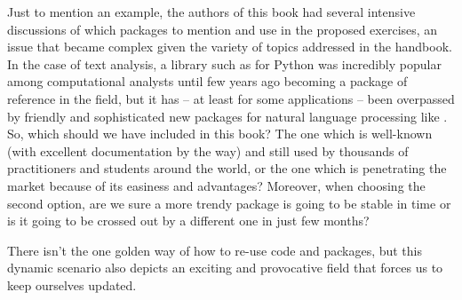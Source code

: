 Just to mention an example, the authors of this book had several intensive discussions of which packages to mention and use in the proposed exercises, an issue that became complex given the variety of topics addressed in the handbook. In the case of text analysis, a library such as  for Python was incredibly popular among computational analysts until few years ago becoming a package of reference in the field, but it has -- at least for some applications -- been overpassed by friendly and sophisticated new packages for natural language processing like . So, which should we have included in this book? The one which is well-known (with excellent documentation by the way) and still used by thousands of practitioners and students around the world, or the one which is penetrating the market because of its easiness and advantages? Moreover, when choosing the second option, are we sure a more trendy package is going to be stable in time or is it going to be crossed out by a different one in just few months?  

There isn't the one golden way of how to re-use code and packages, but this dynamic scenario also depicts an exciting and provocative field that forces us to keep ourselves updated.
